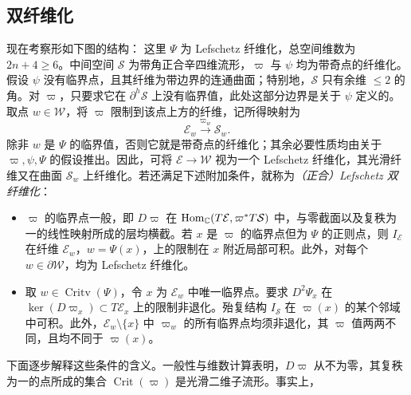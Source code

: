 \subsection{双纤维化}\label{sec:15e}
现在考察形如下图的结构：
这里 $\Psi$ 为 Lefschetz 纤维化，总空间维数为 $2n+4\geq6$。中间空间 $\mathcal S$ 为带角正合辛四维流形，$\varpi$ 与 $\psi$ 均为带奇点的纤维化。假设 $\psi$ 没有临界点，且其纤维为带边界的连通曲面；特别地，$\mathcal S$ 只有余维 $\leq2$ 的角。对 $\varpi$，只要求它在 $\partial^h\mathcal S$ 上没有临界值，此处这部分边界是关于 $\psi$ 定义的。取点 $w\in\mathcal W$，将 $\varpi$ 限制到该点上方的纤维，记所得映射为
\begin{equation}\label{eq:15.12}
\mathcal E_w\xrightarrow{\varpi_w}\mathcal S_w.
\end{equation}
除非 $w$ 是 $\Psi$ 的临界值，否则它就是带奇点的纤维化；其余必要性质均由关于 $\varpi,\psi,\Psi$ 的假设推出。因此，可将 $\mathcal E\to\mathcal W$ 视为一个 Lefschetz 纤维化，其光滑纤维又在曲面 $\mathcal S_w$ 上纤维化。若还满足下述附加条件，就称为\emph{（正合）Lefschetz 双纤维化}：
\begin{itemize}
\item $\varpi$ 的临界点一般，即 $D\varpi$ 在 $\operatorname{Hom}_{\mathbb C}(T\mathcal E,\varpi^*T\mathcal S)$ 中，与零截面以及复秩为一的线性映射所成的层均横截。若 $x$ 是 $\varpi$ 的临界点但为 $\Psi$ 的正则点，则 $I_{\mathcal E}$ 在纤维 $\mathcal E_w$，$w=\Psi(x)$，上的限制在 $x$ 附近局部可积。此外，对每个 $w\in\partial\mathcal W$，均为 Lefschetz 纤维化。
\item 取 $w\in\operatorname{Critv}(\Psi)$，令 $x$ 为 $\mathcal E_w$ 中唯一临界点。要求 $D^2\Psi_x$ 在 $\ker(D\varpi_x)\subset T\mathcal E_x$ 上的限制非退化。殆复结构 $I_{\mathcal S}$ 在 $\varpi(x)$ 的某个邻域中可积。此外，$\mathcal E_w\setminus\{x\}$ 中 $\varpi_w$ 的所有临界点均须非退化，其 $\varpi$ 值两两不同，且均不同于 $\varpi(x)$。
\end{itemize}
下面逐步解释这些条件的含义。一般性与维数计算表明，$D\varpi$ 从不为零，其复秩为一的点所成的集合 $\operatorname{Crit}(\varpi)$ 是光滑二维子流形。事实上，

